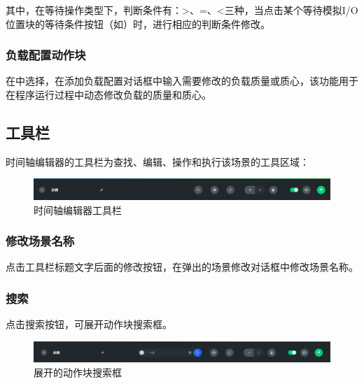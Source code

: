 其中，在等待操作类型下，判断条件有：>、=、<三种，当点击某个等待模拟I/O位置块的等待条件按钮（如）时，进行相应的判断条件修改。

\subsubsection{负载配置动作块}
在中选择，在添加负载配置对话框中输入需要修改的负载质量或质心，该功能用于在程序运行过程中动态修改负载的质量和质心。



\subsection{工具栏}
时间轴编辑器的工具栏为查找、编辑、操作和执行该场景的工具区域：

\begin{figure}[ht]
	\centering
	\includegraphics[width=\textwidth]{screen/3-14.png}
	\caption{时间轴编辑器工具栏}
	\label{fig:时间轴编辑器工具栏}
\end{figure}

\subsubsection{修改场景名称}
点击工具栏标题文字后面的修改按钮，在弹出的场景修改对话框中修改场景名称。
\subsubsection{搜索}
点击搜索按钮，可展开动作块搜索框。

\begin{figure}[ht]
	\centering
	\includegraphics[width=\textwidth]{screen/3-15.png}
	\caption{展开的动作块搜索框}
	\label{fig:展开的动作块搜索框}
\end{figure}

